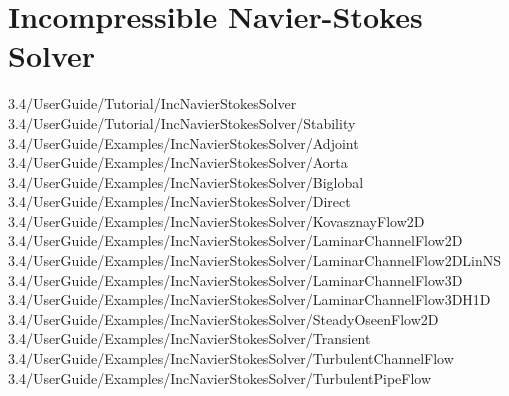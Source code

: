 \section{Incompressible Navier-Stokes Solver}

3.4/UserGuide/Tutorial/IncNavierStokesSolver
3.4/UserGuide/Tutorial/IncNavierStokesSolver/Stability
3.4/UserGuide/Examples/IncNavierStokesSolver/Adjoint
3.4/UserGuide/Examples/IncNavierStokesSolver/Aorta
3.4/UserGuide/Examples/IncNavierStokesSolver/Biglobal
3.4/UserGuide/Examples/IncNavierStokesSolver/Direct
3.4/UserGuide/Examples/IncNavierStokesSolver/KovasznayFlow2D
3.4/UserGuide/Examples/IncNavierStokesSolver/LaminarChannelFlow2D
3.4/UserGuide/Examples/IncNavierStokesSolver/LaminarChannelFlow2DLinNS
3.4/UserGuide/Examples/IncNavierStokesSolver/LaminarChannelFlow3D
3.4/UserGuide/Examples/IncNavierStokesSolver/LaminarChannelFlow3DH1D
3.4/UserGuide/Examples/IncNavierStokesSolver/SteadyOseenFlow2D
3.4/UserGuide/Examples/IncNavierStokesSolver/Transient
3.4/UserGuide/Examples/IncNavierStokesSolver/TurbulentChannelFlow
3.4/UserGuide/Examples/IncNavierStokesSolver/TurbulentPipeFlow


